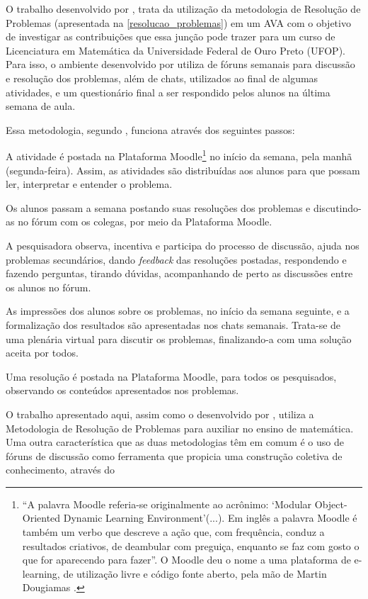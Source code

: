 O trabalho desenvolvido por , trata da utilização da metodologia de Resolução de Problemas (apresentada na \autoref{resolucao_problemas}) em um AVA com o objetivo de 
investigar as contribuições que essa jun\c{c}\~ao pode trazer para um curso de Licenciatura em Matem\'atica da Universidade Federal de Ouro Preto (UFOP). Para isso, 
o ambiente desenvolvido por  utiliza de fóruns semanais para discussão e resolução dos problemas, além de chats, utilizados ao final de algumas atividades, e um 
questionário final a ser respondido pelos alunos na última semana de aula.

Essa metodologia, segundo , funciona atrav\'es dos seguintes passos:
\begin{alineascomnumero}
	\item A atividade é postada na Plataforma Moodle\footnote{``A  palavra  Moodle  referia-se  originalmente  ao  acrônimo:  `Modular Object-Oriented  Dynamic  Learning  Environment'(...).  Em  inglês  a  palavra Moodle é também um verbo que descreve a ação que, com frequência, conduz a resultados criativos, de deambular com preguiça, enquanto se faz com gosto o  que  for  aparecendo  para  fazer''. O  Moodle  deu  o  nome  a  uma  plataforma  de  e-learning,  de  utilização livre  e  código  fonte  aberto,  pela  mão  de  Martin  Dougiamas \cite{oro29585}.} no início da semana, pela manhã (segunda-feira).  Assim,  as  atividades  são  distribuídas  aos  alunos  para  que possam ler, interpretar e entender o problema. 
	\item Os  alunos  passam a  semana  postando  suas  resoluções  dos  problemas e discutindo-as no fórum com os colegas, por meio da Plataforma Moodle. 
	\item A  pesquisadora  observa,  incentiva  e  participa  do  processo  de discussão, ajuda nos problemas secundários, dando \textit{feedback} das resoluções postadas, respondendo e fazendo 
perguntas, tirando  dúvidas, acompanhando de perto as discussões entre os alunos no fórum.
	\item As impressões dos alunos sobre os problemas, no início da semana seguinte, e a formalização dos resultados são apresentadas nos chats semanais. Trata-se  de  uma  plenária  virtual  para  discutir  os  problemas,  finalizando-a  com  uma solução aceita por todos. 
	\item Uma resolução é postada na Plataforma Moodle, para todos os pesquisados, observando os conteúdos apresentados nos problemas. 
\end{alineascomnumero}

O trabalho apresentado aqui, assim como o desenvolvido por , utiliza a Metodologia de Resolu\c{c}\~ao de Problemas para auxiliar no ensino de matem\'atica. Uma 
outra característica que as duas metodologias t\^em em comum \'e o uso de f\'oruns de discuss\~ao como ferramenta que propicia uma constru\c{c}\~ao coletiva de conhecimento, atrav\'es do 
